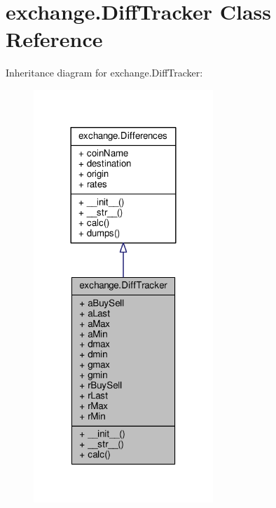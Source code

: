 \hypertarget{classexchange_1_1_diff_tracker}{}\section{exchange.\+Diff\+Tracker Class Reference}
\label{classexchange_1_1_diff_tracker}


Inheritance diagram for exchange.\+Diff\+Tracker\+:\nopagebreak
\begin{figure}[H]
\begin{center}
\leavevmode
\includegraphics[width=192pt]{classexchange_1_1_diff_tracker__inherit__graph}
\end{center}
\end{figure}


